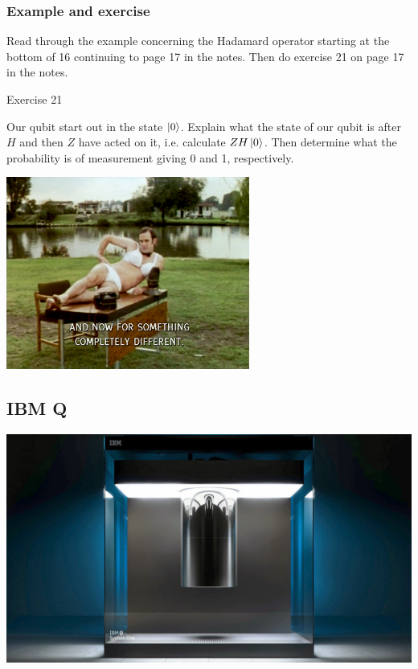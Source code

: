 \documentclass[10pt]{beamer}
\begin{document}
\begin{frame}
  \frametitle{Example and exercise}
  Read through the example concerning the Hadamard operator starting at the bottom of 16 continuing to page 17 in the notes.
  Then do exercise 21 on page 17 in the notes.

  \begin{block}{Exercise 21}
   \centerline{
} 

Our qubit start out in the state $\ket{0}$. Explain what the state of our qubit is after $H$ and then $Z$ have acted on it, i.e. calculate $ZH\ket{0}$. Then determine what the probability is of measurement giving 0 and 1, respectively.
  \end{block}
\end{frame}
\begin{frame}
  \centering
  \includegraphics[width=8cm]{img/completely-different.png}
\end{frame}
\begin{frame}
  \section{IBM Q}
  \centering
  \includegraphics[width=0.7\linewidth]{img/IBMQ.jpg}
\end{frame}
\end{document}
